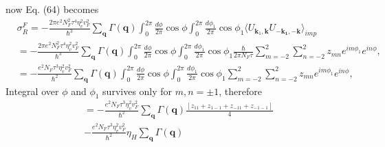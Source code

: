 \documentclass[aps,prb,amsmath,amssymb,footinbib,showpacs,twocolumn]{revtex4-2}
\begin{document}
\begin{widetext}
 now Eq. (64) becomes
 \begin{align}
   &\sigma_{R}^{F}=-\frac{2\pi e^{2}N^{2}_{F}\tau^{4}\eta^{2}_{v}v^{2}_{F}}{\hbar^{3}}\sum_{\textbf{q}}\Gamma(\textbf{q})\int_{0}^{2\pi}\frac{d\phi}{2\pi}\cos\phi\int_{0}^{2\pi}\frac{d\phi_{1}}{2\pi}\cos\phi_{1}\langle U_{\mathbf{k}_{1},\textbf{k}}U_{\mathbf{-k_{1}},\mathbf{-k}}\bigl \rangle_{imp} \nonumber\\
   &=-\frac{2\pi e^{2}N^{2}_{F}\tau^{4}\eta^{2}_{v}v^{2}_{F}}{\hbar^{3}}\sum_{\textbf{q}}\Gamma(\textbf{q})\int_{0}^{2\pi}\frac{d\phi}{2\pi}\cos\phi\int_{0}^{2\pi}\frac{d\phi_{1}}{2\pi}\cos\phi_{1}\frac{\hbar}{2\pi N_{F}\tau}\sum_{m=-2}^{2}\sum_{n=-2}^{2}z_{mn}e^{im\phi_{1}}e^{in\phi},\nonumber\\
   &= -\frac{ e^{2}N_{F}\tau^{3}\eta^{2}_{v}v^{2}_{F}}{\hbar^{2}}\sum_{\textbf{q}}\Gamma(\textbf{q})\int_{0}^{2\pi}\frac{d\phi}{2\pi}\cos\phi\int_{0}^{2\pi}\frac{d\phi_{1}}{2\pi}\cos\phi_{1}\sum_{m=-2}^{2}\sum_{n=-2}^{2}z_{mn}e^{im\phi_{1}}e^{in\phi},
   \end{align}
Integral over $\phi$ and $\phi_{1}$ survives only for $m,n =\pm 1$, therefore
\begin{multline}
 = -\frac{ e^{2}N_{F}\tau^{3}\eta^{2}_{v}v^{2}_{F}}{\hbar^{2}}\sum_{\textbf{q}}\Gamma(\textbf{q})\frac{[z_{11}+z_{1-1}+z_{-11}+z_{-1-1}]}{4} \\
 -\frac{ e^{2}N_{F}\tau^{3}\eta^{2}_{v}v^{2}_{F}}{\hbar^{2}}\eta_{H}\sum_{\textbf{q}}\Gamma(\textbf{q})
\end{multline}
   

\end{widetext}
\end{document}
